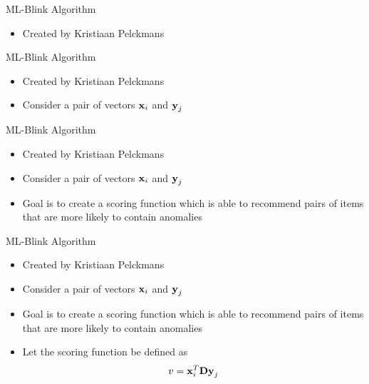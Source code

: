 \begin{frame}{ML-Blink Algorithm}
    \begin{itemize}
        \item Created by Kristiaan Pelckmans
    \end{itemize}
\end{frame}

\begin{frame}{ML-Blink Algorithm}
    \begin{itemize}
        \item Created by Kristiaan Pelckmans
        \item Consider a pair of vectors $\boldsymbol{\mathbf{x}}_i$ and $\boldsymbol{\mathbf{y}}_j$
    \end{itemize}
\end{frame}

\begin{frame}{ML-Blink Algorithm}
    \begin{itemize}
        \item Created by Kristiaan Pelckmans
        \item Consider a pair of vectors $\boldsymbol{\mathbf{x}}_i$ and $\boldsymbol{\mathbf{y}}_j$
        \item Goal is to create a scoring function which is able to recommend pairs of items that are more likely to contain anomalies
    \end{itemize}
\end{frame}

\begin{frame}{ML-Blink Algorithm}
    \begin{itemize}
        \item Created by Kristiaan Pelckmans
        \item Consider a pair of vectors $\boldsymbol{\mathbf{x}}_i$ and $\boldsymbol{\mathbf{y}}_j$
        \item Goal is to create a scoring function which is able to recommend pairs of items that are more likely to contain anomalies
        \item Let the scoring function be defined as 
            \begin{equation} \label{eq:v-explicit}
                v = \boldsymbol{\mathbf{x}}_{i}^{T} \boldsymbol{\mathbf{D}} \boldsymbol{\mathbf{y}}_j  
            \end{equation}
    \end{itemize}
\end{frame}

